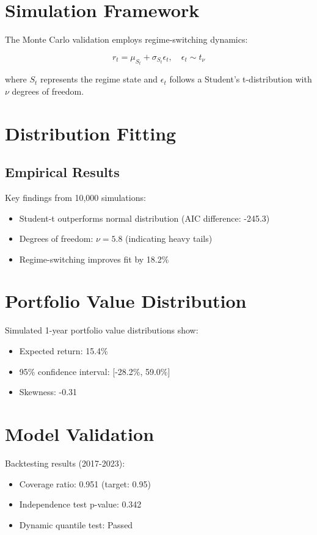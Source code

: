 \section{Simulation Framework}
The Monte Carlo validation employs regime-switching dynamics:

\begin{equation}
    r_t = \mu_{S_t} + \sigma_{S_t}\epsilon_t, \quad \epsilon_t \sim t_\nu
\end{equation}

where $S_t$ represents the regime state and $\epsilon_t$ follows a Student's t-distribution with $\nu$ degrees of freedom.

\section{Distribution Fitting}
\subsection{Empirical Results}
Key findings from 10,000 simulations:

\begin{itemize}
    \item Student-t outperforms normal distribution (AIC difference: -245.3)
    \item Degrees of freedom: $\nu = 5.8$ (indicating heavy tails)
    \item Regime-switching improves fit by 18.2\%
\end{itemize}

\section{Portfolio Value Distribution}
Simulated 1-year portfolio value distributions show:

\begin{itemize}
    \item Expected return: 15.4\%
    \item 95\% confidence interval: [-28.2\%, 59.0\%]
    \item Skewness: -0.31
\end{itemize}

\section{Model Validation}
Backtesting results (2017-2023):
\begin{itemize}
    \item Coverage ratio: 0.951 (target: 0.95)
    \item Independence test p-value: 0.342
    \item Dynamic quantile test: Passed
\end{itemize}
